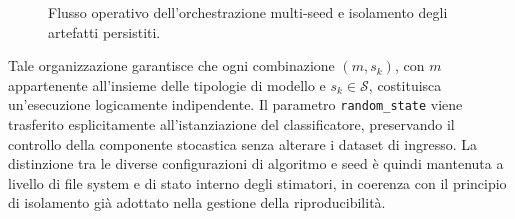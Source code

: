 \begin{figure}[H]
\caption{Flusso operativo dell'orchestrazione multi-seed e isolamento degli artefatti persistiti.}
\label{fig:orchestrazione_training}
\end{figure}

Tale organizzazione garantisce che ogni combinazione $(m,s_k)$, con $m$ appartenente all'insieme delle tipologie di modello e $s_k \in \mathcal{S}$, costituisca un'esecuzione logicamente indipendente. 
Il parametro \texttt{random\_state} viene trasferito esplicitamente all'istanziazione del classificatore, preservando il controllo della componente stocastica senza alterare i dataset di ingresso. 
La distinzione tra le diverse configurazioni di algoritmo e seed è quindi mantenuta a livello di file system e di stato interno degli stimatori, in coerenza con il principio di isolamento già adottato nella gestione della riproducibilità.

